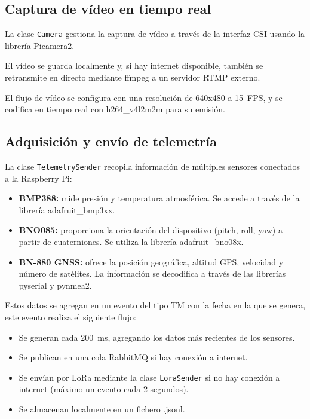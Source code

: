 \subsection{Captura de vídeo en tiempo real}

La clase \texttt{Camera} gestiona la captura de vídeo a través de la interfaz CSI usando la librería Picamera2.

El vídeo se guarda localmente y, si hay internet disponible, también se retransmite en directo mediante ffmpeg a un servidor RTMP externo.

El flujo de vídeo se configura con una resolución de 640x480 a 15~FPS, y se codifica en tiempo real con h264\_v4l2m2m para su emisión.

\subsection{Adquisición y envío de telemetría}

La clase \texttt{TelemetrySender} recopila información de múltiples sensores conectados a la Raspberry Pi:

\begin{itemize}
    \item \textbf{BMP388:} mide presión y temperatura atmosférica.
    Se accede a través de la librería adafruit\_bmp3xx.
    \item \textbf{BNO085:} proporciona la orientación del dispositivo (pitch, roll, yaw) a partir de cuaterniones.
    Se utiliza la librería adafruit\_bno08x.
    \item \textbf{BN-880 GNSS:} ofrece la posición geográfica, altitud GPS, velocidad y número de satélites.
    La información se decodifica a través de las librerías pyserial y pynmea2.
\end{itemize}

Estos datos se agregan en un evento del tipo TM con la fecha en la que se genera, este evento realiza el siguiente flujo:

\begin{itemize}
    \item Se generan cada 200~ms, agregando los datos más recientes de los sensores.
    \item Se publican en una cola RabbitMQ si hay conexión a internet.
    \item Se envían por LoRa mediante la clase \texttt{LoraSender} si no hay conexión a internet (máximo un evento cada 2 segundos).
    \item Se almacenan localmente en un fichero .jsonl.
\end{itemize}

